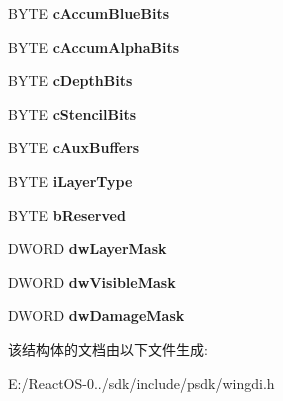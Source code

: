 \begin{DoxyCompactItemize}
\item 
\mbox{\label{structtag_p_i_x_e_l_f_o_r_m_a_t_d_e_s_c_r_i_p_t_o_r_a575874d4c9e0ba3bd189867a1fe2625e}} 
B\+Y\+TE {\bfseries c\+Accum\+Blue\+Bits}
\item 
\mbox{\label{structtag_p_i_x_e_l_f_o_r_m_a_t_d_e_s_c_r_i_p_t_o_r_a75996b9b0b4bbcae8efce123dc003a12}} 
B\+Y\+TE {\bfseries c\+Accum\+Alpha\+Bits}
\item 
\mbox{\label{structtag_p_i_x_e_l_f_o_r_m_a_t_d_e_s_c_r_i_p_t_o_r_a24c0f690e0707d44fdf2b1678e650038}} 
B\+Y\+TE {\bfseries c\+Depth\+Bits}
\item 
\mbox{\label{structtag_p_i_x_e_l_f_o_r_m_a_t_d_e_s_c_r_i_p_t_o_r_aeaa81730b958568dd07b664554b3e041}} 
B\+Y\+TE {\bfseries c\+Stencil\+Bits}
\item 
\mbox{\label{structtag_p_i_x_e_l_f_o_r_m_a_t_d_e_s_c_r_i_p_t_o_r_a135bba4147d3096f2b006add7c3e648d}} 
B\+Y\+TE {\bfseries c\+Aux\+Buffers}
\item 
\mbox{\label{structtag_p_i_x_e_l_f_o_r_m_a_t_d_e_s_c_r_i_p_t_o_r_a7d8c869d5ce50c3dfa8bc6e06fa6de5d}} 
B\+Y\+TE {\bfseries i\+Layer\+Type}
\item 
\mbox{\label{structtag_p_i_x_e_l_f_o_r_m_a_t_d_e_s_c_r_i_p_t_o_r_a5de32926fbc21d4eb7b59815c85f91cb}} 
B\+Y\+TE {\bfseries b\+Reserved}
\item 
\mbox{\label{structtag_p_i_x_e_l_f_o_r_m_a_t_d_e_s_c_r_i_p_t_o_r_aec082b998e6d926559a620446c95b8ae}} 
D\+W\+O\+RD {\bfseries dw\+Layer\+Mask}
\item 
\mbox{\label{structtag_p_i_x_e_l_f_o_r_m_a_t_d_e_s_c_r_i_p_t_o_r_a60f8b8e63a995070531b986c6416150b}} 
D\+W\+O\+RD {\bfseries dw\+Visible\+Mask}
\item 
\mbox{\label{structtag_p_i_x_e_l_f_o_r_m_a_t_d_e_s_c_r_i_p_t_o_r_afed34cc2ba6900db46096239219c5b38}} 
D\+W\+O\+RD {\bfseries dw\+Damage\+Mask}
\end{DoxyCompactItemize}


该结构体的文档由以下文件生成\+:\begin{DoxyCompactItemize}
\item 
E\+:/\+React\+O\+S-\/0../sdk/include/psdk/wingdi.\+h\end{DoxyCompactItemize}
